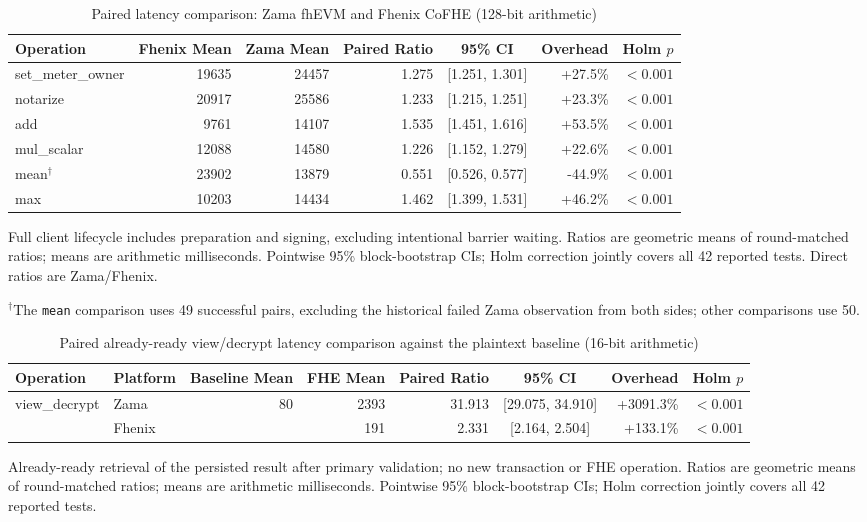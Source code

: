 \begin{table}[!t]
\caption{Paired latency comparison: Zama fhEVM and Fhenix CoFHE (128-bit arithmetic)}
\label{tab:zama-fhenix-lifecycle-comparison-128}
\centering
\footnotesize
\setlength{\tabcolsep}{5pt}
\begin{tabular}{|l|r|r|r|c|r|r|}
\hline
\textbf{Operation} & \textbf{Fhenix Mean} & \textbf{Zama Mean} & \textbf{Paired Ratio} & \textbf{95\% CI} & \textbf{Overhead} & \textbf{Holm \(p\)} \\
\hline
set\_meter\_owner & 19635 & 24457 & 1.275 & [1.251, 1.301] & +27.5\% & $<0.001$ \\
notarize & 20917 & 25586 & 1.233 & [1.215, 1.251] & +23.3\% & $<0.001$ \\
add & 9761 & 14107 & 1.535 & [1.451, 1.616] & +53.5\% & $<0.001$ \\
mul\_scalar & 12088 & 14580 & 1.226 & [1.152, 1.279] & +22.6\% & $<0.001$ \\
mean\(^{\dagger}\) & 23902 & 13879 & 0.551 & [0.526, 0.577] & -44.9\% & $<0.001$ \\
max & 10203 & 14434 & 1.462 & [1.399, 1.531] & +46.2\% & $<0.001$ \\
\hline
\end{tabular}
\vspace{2pt}
\parbox{\textwidth}{\scriptsize Full client lifecycle includes preparation and signing, excluding intentional barrier waiting. Ratios are geometric means of round-matched ratios; means are arithmetic milliseconds. Pointwise 95\% block-bootstrap CIs; Holm correction jointly covers all 42 reported tests. Direct ratios are Zama/Fhenix.}
\parbox{\textwidth}{\scriptsize \(^{\dagger}\)The \texttt{mean} comparison uses 49 successful pairs, excluding the historical failed Zama observation from both sides; other comparisons use 50.}
\end{table}

\begin{table}[!t]
\caption{Paired already-ready view/decrypt latency comparison against the plaintext baseline (16-bit arithmetic)}
\label{tab:paired-lifecycle-comparison-view-16}
\centering
\footnotesize
\setlength{\tabcolsep}{5pt}
\begin{tabular}{|l|l|r|r|r|c|r|r|}
\hline
\textbf{Operation} & \textbf{Platform} & \textbf{Baseline Mean} & \textbf{FHE Mean} & \textbf{Paired Ratio} & \textbf{95\% CI} & \textbf{Overhead} & \textbf{Holm \(p\)} \\
\hline
\multirow{2}{*}{view\_decrypt}
& Zama & \multirow{2}{*}{80} & 2393 & 31.913 & [29.075, 34.910] & +3091.3\% & $<0.001$ \\
& Fhenix &  & 191 & 2.331 & [2.164, 2.504] & +133.1\% & $<0.001$ \\
\hline
\hline
\end{tabular}
\vspace{2pt}
\parbox{\textwidth}{\scriptsize Already-ready retrieval of the persisted result after primary validation; no new transaction or FHE operation. Ratios are geometric means of round-matched ratios; means are arithmetic milliseconds. Pointwise 95\% block-bootstrap CIs; Holm correction jointly covers all 42 reported tests.}
\end{table}

